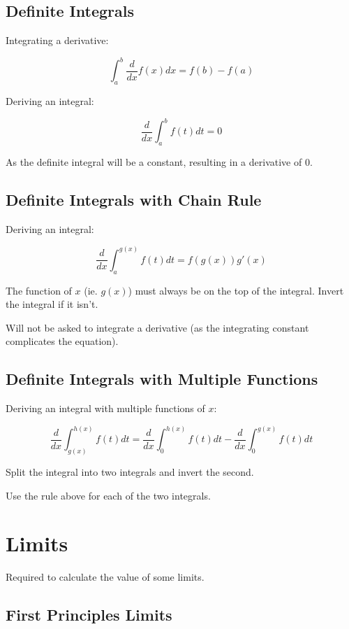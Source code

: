 \documentclass[a4paper,11pt]{article}
\begin{document}
\subsection{Definite Integrals}

Integrating a derivative:

$$
\int_a^b \frac{d}{dx} f(x) dx = f(b) - f(a)
$$

Deriving an integral:

$$
\frac{d}{dx} \int_a^b f(t) dt = 0
$$

As the definite integral will be a constant, resulting in a derivative of 0.


\subsection{Definite Integrals with Chain Rule}

Deriving an integral:

$$
\frac{d}{dx} \int_a^{g(x)} f(t) dt = f(g(x)) g'(x)
$$

The function of $x$ (ie. $g(x)$) must always be on the top of the integral.
Invert the integral if it isn't.

Will not be asked to integrate a derivative (as the integrating constant
complicates the equation).


\subsection{Definite Integrals with Multiple Functions}

Deriving an integral with multiple functions of $x$:

$$
\frac{d}{dx} \int_{g(x)}^{h(x)} f(t) dt = \frac{d}{dx} \int_{0}^{h(x)} f(t) dt - \frac{d}{dx} \int_{0}^{g(x)} f(t) dt
$$

Split the integral into two integrals and invert the second.

Use the rule above for each of the two integrals.




\section{Limits}

Required to calculate the value of some limits.


\subsection{First Principles Limits}
\end{document}
